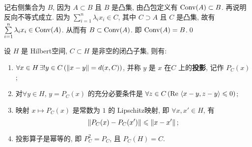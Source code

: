 \begin{Proof}
	记右侧集合为 $ B $, 因为 $ A\subset B $ 且 $ B $ 是凸集, 由凸包定义有 $ \operatorname{Conv}(A)\subset B $. 再说明反向不等式成立. 因为 $ \sum\limits_{i=1}^{n}\lambda_{i}x_{i}\in C $, 其中 $ C\supset A $ 且 $ C $ 是凸集, 故有 $ \sum\limits_{i=1}^{n}\lambda_{i}x_{i}\in\operatorname{Conv}(A) $. 从而有 $ B\subset\operatorname{Conv}(A) $. 即 $ \operatorname{Conv}(A)=B $.\qed
\end{Proof}

\begin{Theorem}[闭凸集投影定理]\label{thm:闭凸集投影定理}
	设 $ H $ 是 Hilbert空间, $ C\subset H $ 是非空的闭凸子集, 则有:
	\begin{enumerate}[(1)]
		\item $ \forall x\in H\,\exists!y\in C\,(\left\| x-y \right\|=d(x, C)) $, 并称 $ y $ 是 $ x $ 在$ C $ 上的\textbf{投影}, 记作 $ P_{C}(x) $;
		\item 对$ \forall y\in H $, $ y=P_{C}(x) $ 的充分必要条件是 $ \forall z\in C\,(\mathrm{Re\,}\left\langle x-y, z-y \right\rangle\leqslant0) $;
		\item 映射 $ x\mapsto P_{C}(x) $ 是常数为 $ 1 $ 的 Lipschitz映射, 即 $ \forall x, x'\in H $, 有
		      \[
			      \left\| P_{C}(x)-P_{C}(x') \right\|\leqslant \left\| x-x' \right\|;
		      \]
		\item 投影算子是幂等的, 即 $ P^{2}_{C}=P_{C} $, 且 $ P_{C}(H)=C $.
	\end{enumerate}
\end{Theorem}

